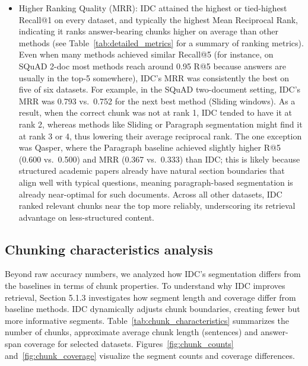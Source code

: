 \documentclass[12pt,a4paper]{report}
\begin{document}
\begin{itemize}
\item Higher Ranking Quality (MRR): IDC attained the highest or tied-highest Recall@1 on every dataset, and typically the highest Mean Reciprocal Rank, indicating it ranks answer-bearing chunks higher on average than other methods (see Table~\ref{tab:detailed_metrics} for a summary of ranking metrics). Even when many methods achieved similar Recall@5 (for instance, on SQuAD 2-doc most methods reach around 0.95 R@5 because answers are usually in the top-5 somewhere), IDC's MRR was consistently the best on five of six datasets. For example, in the SQuAD two-document setting, IDC's MRR was 0.793 vs.\ 0.752 for the next best method (Sliding windows). As a result, when the correct chunk was not at rank 1, IDC tended to have it at rank 2, whereas methods like Sliding or Paragraph segmentation might find it at rank 3 or 4, thus lowering their average reciprocal rank. The one exception was Qasper, where the Paragraph baseline achieved slightly higher R@5 (0.600 vs.\ 0.500) and MRR (0.367 vs.\ 0.333) than IDC; this is likely because structured academic papers already have natural section boundaries that align well with typical questions, meaning paragraph-based segmentation is already near-optimal for such documents. Across all other datasets, IDC ranked relevant chunks near the top more reliably, underscoring its retrieval advantage on less-structured content.
\end{itemize}

\subsection{Chunking characteristics analysis}\label{sec:chunking-analysis}

Beyond raw accuracy numbers, we analyzed how IDC's segmentation differs from the baselines in terms of chunk properties. To understand why IDC improves retrieval, Section 5.1.3 investigates how segment length and coverage differ from baseline methods. IDC dynamically adjusts chunk boundaries, creating fewer but more informative segments. Table~\ref{tab:chunk_characteristics} summarizes the number of chunks, approximate average chunk length (sentences) and answer-span coverage for selected datasets. Figures~\ref{fig:chunk_counts} and~\ref{fig:chunk_coverage} visualize the segment counts and coverage differences.
\end{document}
